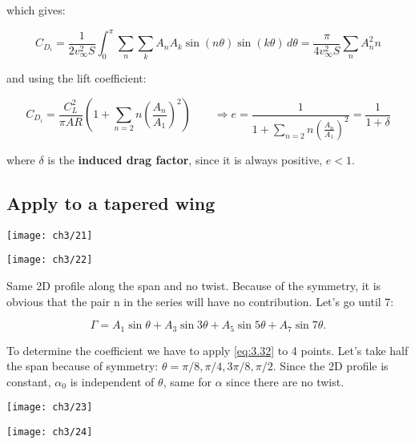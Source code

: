 \documentclass[british,french,11pt, a4paper, openany]{article}
\begin{document}
which gives:

\begin{equation}
C_{D_i} = \frac{1}{2v_\infty ^2 S} \int _0 ^\pi \sum _n \sum _k A_n A_k \sin (n\theta) \sin (k\theta) \, d\theta = \frac{\pi}{4v_\infty ^2 S} \sum _n A_n ^2 n
\end{equation}

and using the lift coefficient:

\begin{equation}
C_{D_i} = \frac{C_L^2}{\pi AR}  \left(1+\sum _{n=2} n \left(\frac{A_n}{A_1}\right)^2 \right) \qquad \Rightarrow e = \frac{1}{1+\sum _{n=2} n \left(\frac{A_n}{A_1}\right)^2} = \frac{1}{1+\delta}
\end{equation}

where $\delta $ is the \textbf{induced drag factor}, since it is always positive, $e<1$. 

\subsection{Apply to a tapered wing}
\begin{center}
	\begin{minipage}{0.4\textwidth}
		\texttt{[image: ch3/21]}
		\label{fig:3.21}
	\end{minipage}
	\begin{minipage}{0.22\textwidth}
		\texttt{[image: ch3/22]}
		\label{fig:3.22}
	\end{minipage}
\end{center}

Same 2D profile along the span and no twist. Because of the symmetry, it is obvious that the pair n in the series will have no contribution. Let's go until 7:

\begin{equation}
\Gamma = A_1\sin \theta + A_3\sin 3\theta + A_5\sin 5\theta + A_7\sin 7\theta.
\end{equation}

To determine the coefficient we have to apply \eqref{eq:3.32} to 4 points. Let's take half the span because of symmetry: $\theta = \pi /8, \pi /4, 3\pi /8, \pi /2$. Since the 2D profile is constant, $\alpha _0$ is independent of $\theta$, same for $\alpha$ since there are no twist. 

\begin{center}
	\begin{minipage}{0.4\textwidth}
		\texttt{[image: ch3/23]}
		\label{fig:3.23}
	\end{minipage}
	\begin{minipage}{0.22\textwidth}
		\texttt{[image: ch3/24]}
		\label{fig:3.24}
	\end{minipage}
\end{center}
\end{document}
